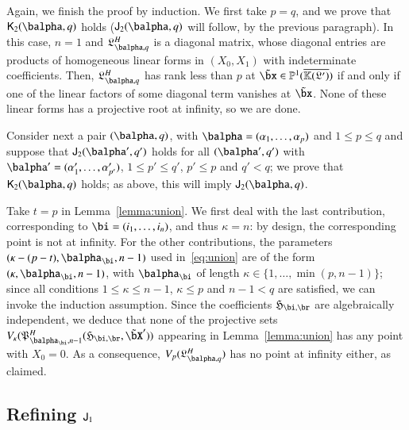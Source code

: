 \documentclass[amsthm]{elsart}
\newtheorem{lemma}[definition]{Lemma}
\begin{document}
Again, we finish the proof by induction. We first take $p=q$, and we
prove that $\assJ_2(\balpha,q)$ holds ($\assI_2(\balpha,q)$ will follow,
by the previous paragraph). In this case, $n=1$ and
$\mathfrak{L}^H_{\balpha,q}$ is a diagonal matrix, whose diagonal entries
are products of homogeneous linear forms in $(X_0,X_1)$ with indeterminate
coefficients. Then, $\mathfrak{L}^H_{\balpha,q}$ has rank less than $p$ at
$\tilde\bx\in\P^1(\KKGpbar)$ if and only if one of the linear factors
of some diagonal term vanishes at $\tilde \bx$. None of these linear
forms has a projective root at infinity, so we are done.

Consider next a pair $(\balpha,q)$, with
$\balpha=(\alpha_1,\dots,\alpha_p)$ and $1 \le p \le q$ and suppose
that $\assI_2(\balpha',q')$ holds for all $(\balpha',q')$ with
$\balpha'=(\alpha'_1,\dots,\alpha'_{p'})$, $1 \le p' \le q'$, $p' \le p$ and $q'
< q$; we prove that $\assJ_2(\balpha,q)$ holds; as above, this will
imply $\assI_2(\balpha,q)$.

Take $t=p$ in Lemma~\ref{lemma:union}. We first deal with the last
contribution, corresponding to $\bi=(i_1,\dots,i_n)$, and thus
$\kappa=n$: by design, the corresponding point is not at infinity. For
the other contributions, the parameters $(\kappa-(p-t),\balpha_\bi,n-1)$
used in~\eqref{eq:union} are of the form $(\kappa,\balpha_\bi,n-1)$, with
$\balpha_\bi$ of length $\kappa \in \{1,\dots, \min(p,n-1)\}$; since all
conditions $1 \le \kappa \le n-1$, $\kappa \le p$ and $n-1 < q$ are satisfied,
we can invoke the induction assumption. Since the coefficients
$\mathfrak{H}_{\bi,\br}$ are algebraically independent, we deduce that
none of the projective sets
$V_\kappa(\mathfrak{P}^H_{\balpha_\bi,n-1}(\mathfrak{H}_{\bi,\br},\tilde\bX'))$ appearing in
Lemma~\ref{lemma:union} has any point with $X_0=0$. As a consequence,
$V_p(\mathfrak{L}^H_{\balpha,q})$ has no point at infinity either, as
claimed.


\subsection{Refining $\mathsf{J}_1$} 

\end{document}
